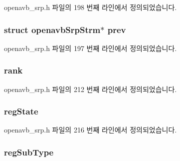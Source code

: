 openavb\+\_\+srp.\+h 파일의 198 번째 라인에서 정의되었습니다.

\subsubsection[{\texorpdfstring{prev}{prev}}]{\setlength{\rightskip}{0pt plus 5cm}struct {\bf openavb\+Srp\+Strm}$\ast$ prev}\hypertarget{structopenavb_srp_strm_ab5251de873929eead67dee4ba7f15d8a}{}\label{structopenavb_srp_strm_ab5251de873929eead67dee4ba7f15d8a}


openavb\+\_\+srp.\+h 파일의 197 번째 라인에서 정의되었습니다.

\subsubsection[{\texorpdfstring{rank}{rank}}]{ rank}\hypertarget{structopenavb_srp_strm_a6942178950dac6f17c094fb856a3c6eb}{}\label{structopenavb_srp_strm_a6942178950dac6f17c094fb856a3c6eb}


openavb\+\_\+srp.\+h 파일의 212 번째 라인에서 정의되었습니다.

\subsubsection[{\texorpdfstring{reg\+State}{regState}}]{ reg\+State}\hypertarget{structopenavb_srp_strm_aa761b2a55e2cd2b588f6660f667b7682}{}\label{structopenavb_srp_strm_aa761b2a55e2cd2b588f6660f667b7682}


openavb\+\_\+srp.\+h 파일의 216 번째 라인에서 정의되었습니다.

\subsubsection[{\texorpdfstring{reg\+Sub\+Type}{regSubType}}]{ reg\+Sub\+Type}\hypertarget{structopenavb_srp_strm_aaaebdabb6f9f66f3eec3a68525b0756b}{}\label{structopenavb_srp_strm_aaaebdabb6f9f66f3eec3a68525b0756b}


